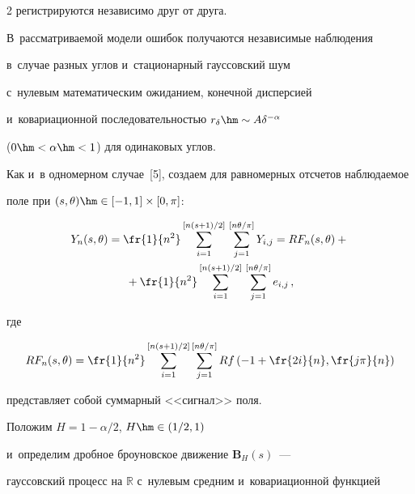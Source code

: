 \begin{multicols}{2}
регистрируются независимо друг от друга.


В~рассматриваемой модели ошибок получаются независимые наблюдения


в~случае разных углов и~стационарный гауссовский шум


с~нулевым математическим ожиданием, конечной дисперсией


и~ковариационной последовательностью $r_\delta \hm\sim A \delta^{-\alpha}$


($0\hm<\alpha\hm<1$) для одинаковых углов.





Как и~в одномерном случае~[5], создаем для равномерных отсчетов наблюдаемое


поле при $(s,\theta)\hm\in [-1,1]\times[0,\pi]$:


\begin{multline*}


Y_n(s,\theta) = \fr{1}{n^2} \sum\limits_{i=1}^{[n(s+1)/2]}\,


\sum\limits_{j=1}^{[n\theta/\pi]} Y_{i,j}=


RF_n(s,\theta) + {}\\


{}+\fr{1}{n^2} \sum\limits_{i=1}^{[n(s+1)/2]}\,


\sum\limits_{j=1}^{[n\theta/\pi]} e_{i,j}\,,


\end{multline*}


где


\begin{equation*}


RF_n(s,\theta)= \fr{1}{n^2}


\sum\limits_{i=1}^{[n(s+1)/2]}\sum\limits_{j=1}^{[n\theta/\pi]}


R f\left(-1+\fr{2i}{n},\fr{j\pi}{n}\right)


\end{equation*}


представляет собой суммарный <<сигнал>> поля.





Положим $H = 1- \alpha/2$, $H \hm\in (1/2,1)$


и~определим дробное броуновское движение $\mathbf{B}_H(s)$~---


гауссовский процесс на $\mathbb{R}$ с~нулевым средним  и~ковариационной функцией


\begin{equation*}



\end{equation*}
\end{multicols}
